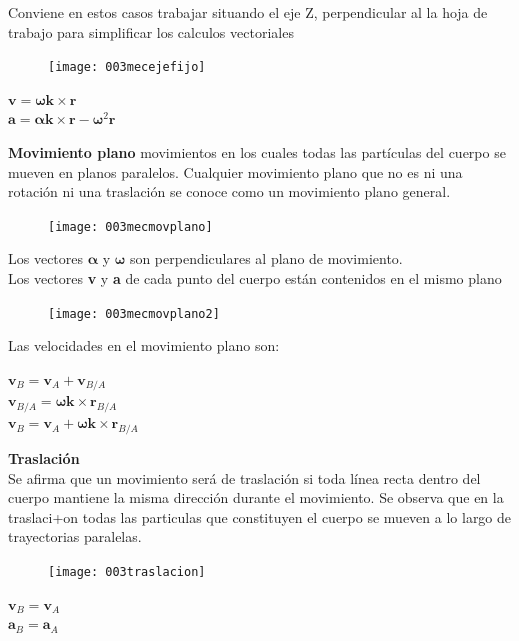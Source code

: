 \documentclass[11pt,a4paper,twocolumn]{article}
\newcommand{\vc}[1]{\textbf{#1}}
\newcommand{\vcs}[1]{\boldsymbol{#1}}
\begin{document}
	Conviene en estos casos trabajar situando el eje Z, perpendicular al la hoja de trabajo para simplificar los calculos vectoriales
	
	\begin{figure}[ht]
		\centering
		\texttt{[image: 003mecejefijo]}
	\end{figure}
	\vspace{-0.7 cm}
	\begin{center}
		$\vc{v}=\vcs{\omega}\vc{k}\times \vc{r}$\\
		$\vc{a}=\vcs{\alpha}\vc{k}\times\vc{r}-\vcs{\omega}^{2}\vc{r}$
	\end{center}

	\newpage
	
	\textbf{Movimiento plano}
	movimientos en los cuales todas las partículas del cuerpo se mueven en planos paralelos. Cualquier movimiento plano que no es ni una rotación ni una traslación se conoce como un movimiento plano general.
	
	\begin{figure}[ht]
		\centering
		\texttt{[image: 003mecmovplano]}
	\end{figure}

	\noindent Los vectores $\vcs{\alpha}$ y $\vcs{\omega}$ son perpendiculares al plano de movimiento.\\
	Los vectores \vc{v} y \vc{a} de cada punto del cuerpo están contenidos en el mismo plano 
	
	\begin{figure}[ht]
		\centering
		\texttt{[image: 003mecmovplano2]}
	\end{figure}
	
	Las velocidades en el movimiento plano son:
	\begin{center}
		 $\vc{v}_{B}=\vc{v}_{A}+\vc{v}_{B/A}$\\
		 $\vc{v}_{B/A}=\vcs{\omega}\vc{k}\times\vc{r}_{B/A}$\\
		 $\vc{v}_{B}=\vc{v}_{A}+\vcs{\omega}\vc{k}\times\vc{r}_{B/A}$\\
	\end{center}

	\textbf{Traslación}\\
	Se afirma que un movimiento será de traslación si toda línea recta dentro del cuerpo mantiene la misma dirección durante el movimiento. Se observa que en la traslaci+on todas las particulas que constituyen el cuerpo se mueven a lo largo de trayectorias paralelas.\\
	\begin{figure}[ht]
		\centering
		\texttt{[image: 003traslacion]}
	\end{figure}
		\begin{center}
		$\vc{v}_{B}=\vc{v}_{A}$\\
		$\vc{a}_{B}=\vc{a}_{A}$\\
	\end{center}
\end{document}
